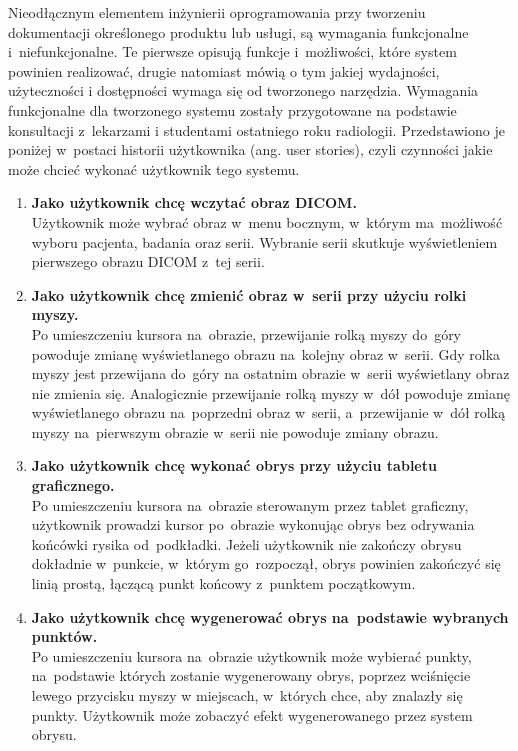 \documentclass[a4paper,11pt,twoside,openright]{report}
\theoremstyle{definition}
\begin{document}
Nieodłącznym elementem inżynierii oprogramowania przy tworzeniu dokumentacji
określonego produktu lub usługi, są wymagania funkcjonalne i~niefunkcjonalne.
Te pierwsze opisują funkcje i~możliwości, które system powinien realizować, drugie
natomiast mówią o tym jakiej wydajności, użyteczności i dostępności wymaga się od tworzonego narzędzia.
Wymagania funkcjonalne dla tworzonego systemu zostały przygotowane na podstawie
konsultacji z~lekarzami i studentami ostatniego roku radiologii. Przedstawiono
je poniżej w~postaci historii użytkownika (ang. user stories), czyli czynności
jakie może chcieć wykonać użytkownik tego systemu.
\begin{enumerate}
\item \textbf {Jako użytkownik chcę wczytać obraz DICOM.} \\
Użytkownik może wybrać obraz w~menu bocznym, w~którym ma~możliwość wyboru pacjenta,
badania oraz serii. Wybranie serii skutkuje wyświetleniem pierwszego obrazu DICOM z~tej serii.

\item \textbf {Jako użytkownik chcę zmienić obraz w~serii przy użyciu rolki myszy.} \\
Po umieszczeniu kursora na~obrazie, przewijanie rolką myszy do~góry powoduje zmianę
wyświetlanego obrazu na~kolejny obraz w~serii. Gdy rolka myszy jest przewijana do~góry
na ostatnim obrazie w~serii wyświetlany obraz nie zmienia się. Analogicznie
przewijanie rolką myszy w~dół powoduje zmianę wyświetlanego obrazu na~poprzedni
obraz w~serii, a~przewijanie w~dół rolką myszy na~pierwszym obrazie w~serii nie
powoduje zmiany obrazu.

\item \textbf {Jako użytkownik chcę wykonać obrys przy użyciu tabletu graficznego.} \\
Po umieszczeniu kursora na~obrazie sterowanym przez tablet graficzny, użytkownik
prowadzi kursor po~obrazie wykonując obrys bez odrywania końcówki rysika od~podkładki.
Jeżeli użytkownik nie zakończy obrysu dokładnie w~punkcie, w~którym go~rozpoczął,
obrys powinien zakończyć się linią prostą, łączącą punkt końcowy z~punktem początkowym.

\item \textbf {Jako użytkownik chcę wygenerować obrys na~podstawie wybranych punktów.} \\
Po umieszczeniu kursora na~obrazie użytkownik może wybierać punkty, na~podstawie
których zostanie wygenerowany obrys, poprzez wciśnięcie lewego przycisku myszy w
miejscach, w~których chce, aby znalazły się punkty. Użytkownik może zobaczyć efekt
wygenerowanego przez system obrysu.


\end{enumerate}
\end{document}
